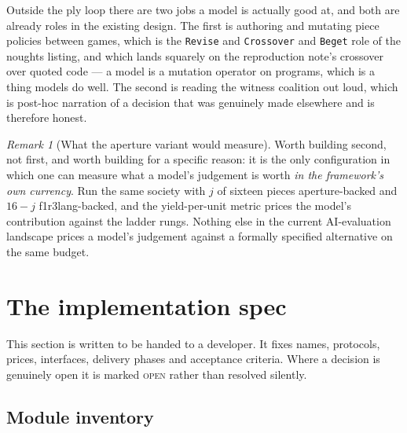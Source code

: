 \documentclass[11pt,a4paper]{article}
\theoremstyle{plain}
\theoremstyle{definition}
\theoremstyle{remark}
\newtheorem{remark}[theorem]{Remark}
\newcommand{\flang}{\textsf{f1r3lang}}
\begin{document}
Outside the ply loop there are two jobs a model is actually good at, and both
are already roles in the existing design. The first is authoring and mutating
piece policies between games, which is the \texttt{Revise} and \texttt{Crossover}
and \texttt{Beget} role of the noughts listing, and which lands squarely on the
reproduction note's crossover over quoted code --- a model is a mutation operator
on programs, which is a thing models do well. The second is reading the witness
coalition out loud, which is post-hoc narration of a decision that was genuinely
made elsewhere and is therefore honest.

\begin{remark}[What the aperture variant would measure]
\label{rem:apvar}
Worth building second, not first, and worth building for a specific reason: it
is the only configuration in which one can measure what a model's judgement is
worth \emph{in the framework's own currency}. Run the same society with $j$ of
sixteen pieces aperture-backed and $16-j$ \flang-backed, and the yield-per-unit
metric prices the model's contribution against the ladder rungs. Nothing else in
the current AI-evaluation landscape prices a model's judgement against a
formally specified alternative on the same budget.
\end{remark}

\section{The implementation spec}
\label{sec:spec}

This section is written to be handed to a developer. It fixes names, protocols,
prices, interfaces, delivery phases and acceptance criteria. Where a decision is
genuinely open it is marked \textsc{open} rather than resolved silently.

\subsection{Module inventory}
\label{sec:modules}
\end{document}
